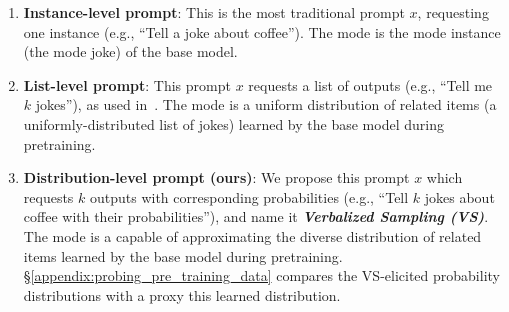 \begin{enumerate}[nolistsep, leftmargin=*]
\item \textbf{Instance-level prompt}: This is the most traditional prompt $x$, requesting one instance (e.g., ``Tell a joke about coffee''). The mode is the mode instance (the mode joke) of the base model. %
    \item \textbf{List-level prompt}: This prompt $x$ requests a list of outputs (e.g., ``Tell me $k$ jokes''), as used in~\cite{wang2023self, dubois2023alpacafarm}. The mode is a uniform distribution of related items (a uniformly-distributed list of jokes) learned by the base model during pretraining.    
    \item \textbf{Distribution-level prompt (ours)}: We propose this prompt $x$ which requests $k$ outputs with corresponding probabilities (e.g., ``Tell $k$ jokes about coffee with their probabilities''), and name it \textbf{\textit{Verbalized Sampling (VS)}}. The mode is a  capable of approximating
    the diverse distribution of related items learned by the base model during pretraining. \S\ref{appendix:probing_pre_training_data} compares the VS-elicited probability distributions with a proxy this learned distribution. 
\end{enumerate}

